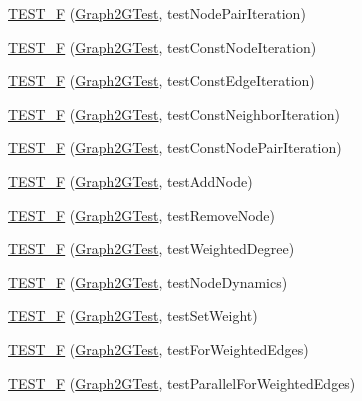 \begin{DoxyCompactItemize}
\item 
\hyperlink{namespace_networ_kit_a8b4f69971456ffcba5de0035d83f31da}{T\-E\-S\-T\-\_\-\-F} (\hyperlink{class_networ_kit_1_1_graph2_g_test}{Graph2\-G\-Test}, test\-Node\-Pair\-Iteration)
\item 
\hyperlink{namespace_networ_kit_a5aefb711bc65f7419de5569b2eb060d8}{T\-E\-S\-T\-\_\-\-F} (\hyperlink{class_networ_kit_1_1_graph2_g_test}{Graph2\-G\-Test}, test\-Const\-Node\-Iteration)
\item 
\hyperlink{namespace_networ_kit_adc14ebd4b06325a8f4ed524e074203aa}{T\-E\-S\-T\-\_\-\-F} (\hyperlink{class_networ_kit_1_1_graph2_g_test}{Graph2\-G\-Test}, test\-Const\-Edge\-Iteration)
\item 
\hyperlink{namespace_networ_kit_a2cf816430e383e3b47f51bd7cc47e96b}{T\-E\-S\-T\-\_\-\-F} (\hyperlink{class_networ_kit_1_1_graph2_g_test}{Graph2\-G\-Test}, test\-Const\-Neighbor\-Iteration)
\item 
\hyperlink{namespace_networ_kit_afd34fb7563a7b4fcde46773d0cc60e64}{T\-E\-S\-T\-\_\-\-F} (\hyperlink{class_networ_kit_1_1_graph2_g_test}{Graph2\-G\-Test}, test\-Const\-Node\-Pair\-Iteration)
\item 
\hyperlink{namespace_networ_kit_a430f8132c2c2aa7869c9fb981a21289a}{T\-E\-S\-T\-\_\-\-F} (\hyperlink{class_networ_kit_1_1_graph2_g_test}{Graph2\-G\-Test}, test\-Add\-Node)
\item 
\hyperlink{namespace_networ_kit_ad8f83c42255cd25412366ce69b9a5bb3}{T\-E\-S\-T\-\_\-\-F} (\hyperlink{class_networ_kit_1_1_graph2_g_test}{Graph2\-G\-Test}, test\-Remove\-Node)
\item 
\hyperlink{namespace_networ_kit_a1e522046082d6d3a8114ed198227a474}{T\-E\-S\-T\-\_\-\-F} (\hyperlink{class_networ_kit_1_1_graph2_g_test}{Graph2\-G\-Test}, test\-Weighted\-Degree)
\item 
\hyperlink{namespace_networ_kit_ae3666d555ed67307c14a570844f884ec}{T\-E\-S\-T\-\_\-\-F} (\hyperlink{class_networ_kit_1_1_graph2_g_test}{Graph2\-G\-Test}, test\-Node\-Dynamics)
\item 
\hyperlink{namespace_networ_kit_a72e4e7cf169c46cdb2b30a708e78b1c5}{T\-E\-S\-T\-\_\-\-F} (\hyperlink{class_networ_kit_1_1_graph2_g_test}{Graph2\-G\-Test}, test\-Set\-Weight)
\item 
\hyperlink{namespace_networ_kit_a220b9f3564ad2a3ca002e7e5a4b0df0a}{T\-E\-S\-T\-\_\-\-F} (\hyperlink{class_networ_kit_1_1_graph2_g_test}{Graph2\-G\-Test}, test\-For\-Weighted\-Edges)
\item 
\hyperlink{namespace_networ_kit_a585f39c9a28f9e64c9ce018120fb018c}{T\-E\-S\-T\-\_\-\-F} (\hyperlink{class_networ_kit_1_1_graph2_g_test}{Graph2\-G\-Test}, test\-Parallel\-For\-Weighted\-Edges)

\end{DoxyCompactItemize}
